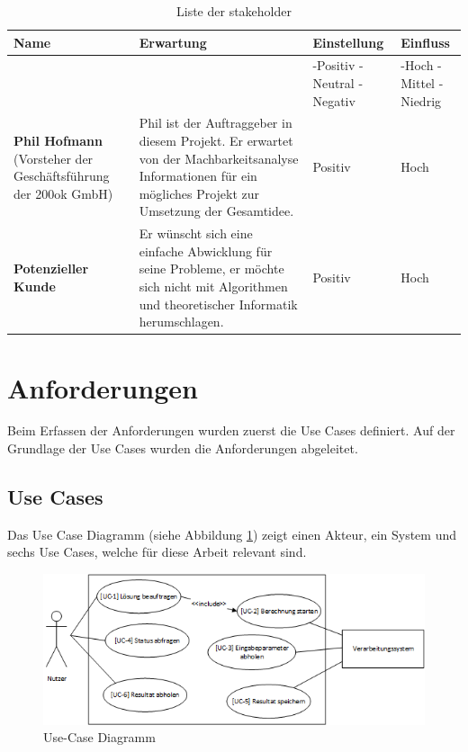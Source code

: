 \begin{table}[ht]
\centering
  \begin{tabular}{ p{5cm} | p{5cm} | p{1.5cm} | p{1.5cm} }
	\hline
	\rowcolor{darkgray}
	\textbf{Name}					&	\textbf{Erwartung}	&	\textbf{Einstellung} 	&	\textbf{Einfluss}	\\ \hline
	\rowcolor{gray}
								&				&	-Positiv \mbox{-Neutral} \mbox{-Negativ} 	&	-Hoch \mbox{-Mittel} \mbox{-Niedrig} \\ \hline
	\textbf{Phil Hofmann} (Vorsteher der Geschäftsführung der 200ok GmbH)						
								&	Phil ist der Auftraggeber in diesem Projekt. Er erwartet von der Machbarkeitsanalyse Informationen für ein mögliches Projekt zur 
									Umsetzung der Gesamtidee.
												& 	Positiv		&	Hoch		\\ \hline
	\textbf{Potenzieller Kunde}
								&	Er wünscht sich eine einfache Abwicklung für seine Probleme, er möchte sich nicht mit Algorithmen und 
									theoretischer Informatik herumschlagen.
												& 	Positiv		&	Hoch		\\ \hline
  \end{tabular}
   \caption{Liste der \gls{stakeholder}}\label{table:stakeholder}
\end{table}

\newpage
\section{Anforderungen}\label{sec.anfoderungen}
Beim Erfassen der Anforderungen wurden zuerst die Use Cases definiert. Auf der Grundlage der Use Cases wurden die Anforderungen abgeleitet.

\subsection{Use Cases}\label{use_cases}
Das Use Case Diagramm (siehe Abbildung \ref{fig:use_case}) zeigt einen Akteur, ein System und sechs Use Cases, welche für diese Arbeit relevant sind.
\begin{figure}[h]
\includegraphics{images/anforderungen/use_cases.png}
\caption[Use-Case Diagramm]{Use-Case Diagramm \selfmade{}}
\label{fig:use_case}
\end{figure}

